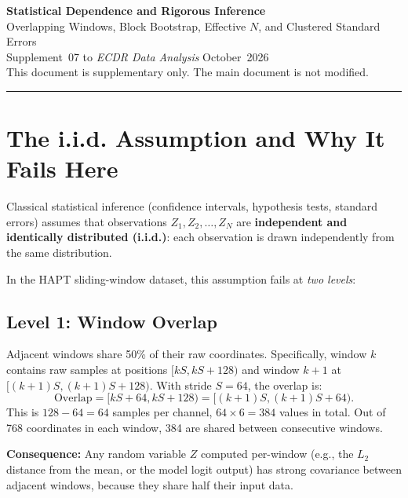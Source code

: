 \documentclass[11pt, a4paper]{article}
\theoremstyle{definition}
\theoremstyle{plain}
\begin{document}
\begin{center}
  {\LARGE\bfseries\color{teal} Statistical Dependence and Rigorous Inference}\\[0.5em]
  {\large\color{muted} Overlapping Windows, Block Bootstrap, Effective $N$, and Clustered Standard Errors}\\[1.2em]
  {\normalsize Supplement~07 to \textit{ECDR Data Analysis} \textbar{} October~2026}\\[0.3em]
  {\small\color{muted} This document is supplementary only. The main document is not modified.}
\end{center}

\vspace{1em}\hrule\vspace{1em}

\tableofcontents
\clearpage

\section{The i.i.d. Assumption and Why It Fails Here}

Classical statistical inference (confidence intervals, hypothesis tests,
standard errors) assumes that observations $Z_1, Z_2, \ldots, Z_N$ are
\textbf{independent and identically distributed (i.i.d.)}: each observation is
drawn independently from the same distribution.

In the HAPT sliding-window dataset, this assumption fails at \emph{two levels}:

\subsection{Level 1: Window Overlap}

Adjacent windows share 50\% of their raw coordinates. Specifically, window $k$
contains raw samples at positions $[kS, kS + 128)$ and window $k+1$ at
$[(k+1)S, (k+1)S + 128)$. With stride $S = 64$, the overlap is:
\[
  \text{Overlap} = [kS + 64, kS + 128) = [(k+1)S, (k+1)S + 64).
\]
This is $128 - 64 = 64$ samples per channel, $64 \times 6 = 384$ values in total.
Out of 768 coordinates in each window, 384 are shared between consecutive windows.

\textbf{Consequence:} Any random variable $Z$ computed per-window (e.g., the $L_2$
distance from the mean, or the model logit output) has strong covariance between
adjacent windows, because they share half their input data.
\end{document}
